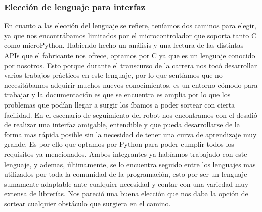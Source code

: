 \subsubsection{Elección de lenguaje para interfaz}

En cuanto a las elección del lenguaje se refiere, teníamos dos caminos para elegir, ya que nos encontrábamos limitados por el microcontrolador que soporta tanto C como microPython. Habiendo hecho un análisis y una lectura de las distintas APIs que el fabricante nos ofrece, optamos por C ya que es un lenguaje conocido por nosotros. Esto porque durante el transcurso de la carrera nos tocó desarrollar varios trabajos prácticos en este lenguaje, por lo que sentíamos que no necesitábamos adquirir muchos nuevos conocimientos, es un entorno cómodo para trabajar y la documentación es que se encuentra es amplia por lo que los problemas que podían llegar a surgir los íbamos a poder sortear con cierta facilidad.
En el escenario de seguimiento del robot nos encontramos con el desafió de realizar una interfaz amigable, entendible y que pueda desarrollarse de la forma mas rápida posible sin la necesidad de tener una curva de aprendizaje muy grande. Es por ello que optamos por Python para poder cumplir todos los requisitos ya mencionados. Ambos integrantes ya habíamos trabajado con este lenguaje, y ademas, últimamente, se lo encuentra seguido entre los lenguajes mas utilizados por toda la comunidad de la programación, esto por ser un lenguaje sumamente adaptable ante cualquier necesidad y contar con una variedad muy extensa de librerías. Nos pareció una buena elección que nos daba la opción de sortear cualquier obstáculo que surgiera en el camino.